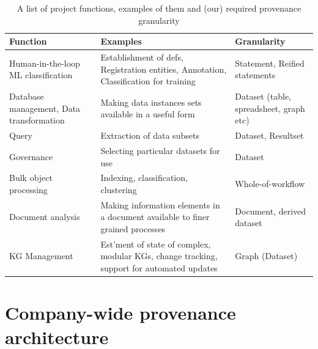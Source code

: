 \documentclass[letterpaper,twocolumn,10pt]{article}
\begin{document}
\begin{table}[t]
  \centering
  \begin{tabular}{|p{5cm}|p{5cm}|p{5cm}|}
    \hline
    \textbf{Function} & \textbf{Examples} & \textbf{Granularity}\\
    \hline
    Human-in-the-loop ML classification & Establishment of defs, Registration entities, Annotation, Classification for training & Statement, Reified statements\\ 
    \hline
    Database management, Data transformation & Making data instances sets available in a useful form & Dataset (table, spreadsheet, graph etc)\\ 
    \hline
    Query & Extraction of data subsets & Dataset, Resultset\\
    \hline
    Governance & Selecting particular datasets for use & Dataset\\
    \hline
    Bulk object processing & Indexing, classification, clustering & Whole-of-workflow\\
    \hline
    Document analysis & Making information elements in a document available to finer grained processes & Document, derived dataset\\
    \hline
    KG Management & Est'ment of state of complex, modular KGs, change tracking, support for automated updates & Graph (Dataset)\\
    \hline
  \end{tabular}
  \caption{A list of project functions, examples of them and (our) required provenance granularity}
  \label{tab:1}
\end{table}


\section{Company-wide provenance architecture}
\end{document}
